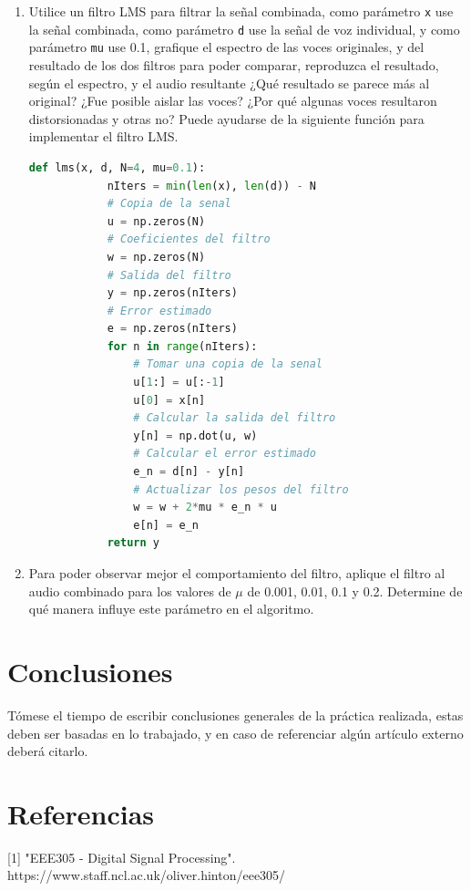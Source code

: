 \documentclass[a4paper,12pt]{article} %
\begin{document}
\begin{enumerate}
    \item Utilice un filtro LMS para filtrar la señal combinada, como parámetro \verb|x| use la señal combinada, como parámetro \verb|d| use la señal de voz individual, y como parámetro \verb|mu| use 0.1, grafique el espectro de las voces originales, y del resultado de los dos filtros para poder comparar, reproduzca el resultado, según el espectro, y el audio resultante ¿Qué resultado se parece más al original? ¿Fue posible aislar las voces? ¿Por qué algunas voces resultaron distorsionadas y otras no? Puede ayudarse de la siguiente función para implementar el filtro LMS.
    \clearpage
    \begin{lstlisting}[language=python]
        def lms(x, d, N=4, mu=0.1):
            nIters = min(len(x), len(d)) - N
            # Copia de la senal
            u = np.zeros(N)
            # Coeficientes del filtro
            w = np.zeros(N)
            # Salida del filtro
            y = np.zeros(nIters)
            # Error estimado
            e = np.zeros(nIters)
            for n in range(nIters):
                # Tomar una copia de la senal
                u[1:] = u[:-1]
                u[0] = x[n]
                # Calcular la salida del filtro
                y[n] = np.dot(u, w)
                # Calcular el error estimado
                e_n = d[n] - y[n]
                # Actualizar los pesos del filtro
                w = w + 2*mu * e_n * u
                e[n] = e_n
            return y
    \end{lstlisting}
        
    \item Para poder observar mejor el comportamiento del filtro, aplique el filtro al audio combinado para los valores de $\mu$ de 0.001, 0.01, 0.1 y 0.2. Determine de qué manera influye este parámetro en el algoritmo.
\end{enumerate}

\section*{Conclusiones}

Tómese el tiempo de escribir conclusiones generales de la práctica realizada, estas deben ser basadas en lo trabajado, y en caso de referenciar algún artículo externo deberá citarlo.

\section*{Referencias}
[1] "EEE305 - Digital Signal Processing". https://www.staff.ncl.ac.uk/oliver.hinton/eee305/
\end{document}
